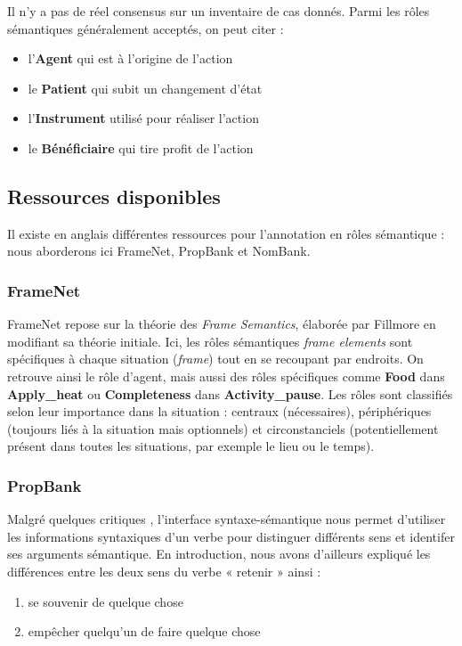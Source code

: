 Il n'y a pas de réel consensus sur un inventaire de cas donnés. Parmi les rôles sémantiques généralement acceptés, on peut citer :
\begin{itemize}
    \item l'\textbf{Agent} qui est à l'origine de l'action
    \item le \textbf{Patient} qui subit un changement d'état
    \item l'\textbf{Instrument} utilisé pour réaliser l'action
    \item le \textbf{Bénéficiaire} qui tire profit de l'action
\end{itemize}

\subsection{Ressources disponibles}

Il existe en anglais différentes ressources pour l'annotation en rôles sémantique : nous aborderons ici FrameNet, PropBank et NomBank.

\subsubsection{FrameNet}

FrameNet repose sur la théorie des \textit{Frame Semantics}, élaborée par Fillmore en modifiant sa théorie initiale. Ici, les rôles sémantiques \textit{frame elements} sont spécifiques à chaque situation (\textit{frame}) tout en se recoupant par endroits. On retrouve ainsi le rôle d'agent, mais aussi des rôles spécifiques comme \textbf{Food} dans \textbf{Apply\_heat} ou \textbf{Completeness} dans \textbf{Activity\_pause}. Les rôles sont classifiés selon leur importance dans la situation : centraux (nécessaires), périphériques (toujours liés à la situation mais optionnels) et circonstanciels (potentiellement présent dans toutes les situations, par exemple le lieu ou le temps).

\subsubsection{PropBank}

Malgré quelques critiques \citep{riemer2011conception}, l'interface syntaxe-sémantique nous permet d'utiliser les informations syntaxiques d'un verbe pour distinguer différents sens et identifer ses arguments sémantique. En introduction, nous avons d'ailleurs expliqué les différences entre les deux sens du verbe « retenir » ainsi :
\begin{enumerate}
    \item se souvenir de quelque chose
    \item empêcher quelqu'un de faire quelque chose
\end{enumerate}

